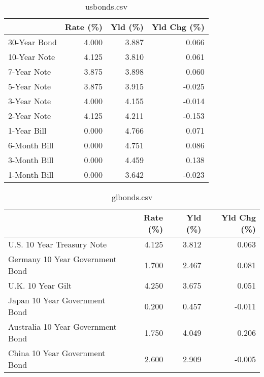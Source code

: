 \documentclass{article}%
\begin{document}
%


\begin{table}[htbp]%
\caption{usbonds.csv}%
\centering%
\begin{adjustbox}{width=1\textwidth}%
\begin{tabular}{lrrr}
\toprule
             &  Rate (\%) &  Yld (\%) &  Yld Chg (\%) \\
\midrule
30-Year Bond &     4.000 &    3.887 &        0.066 \\
10-Year Note &     4.125 &    3.810 &        0.061 \\
 7-Year Note &     3.875 &    3.898 &        0.060 \\
 5-Year Note &     3.875 &    3.915 &       -0.025 \\
 3-Year Note &     4.000 &    4.155 &       -0.014 \\
 2-Year Note &     4.125 &    4.211 &       -0.153 \\
 1-Year Bill &     0.000 &    4.766 &        0.071 \\
6-Month Bill &     0.000 &    4.751 &        0.086 \\
3-Month Bill &     0.000 &    4.459 &        0.138 \\
1-Month Bill &     0.000 &    3.642 &       -0.023 \\
\bottomrule
\end{tabular}
%
\end{adjustbox}%
\end{table}

%


\begin{table}[htbp]%
\caption{glbonds.csv}%
\centering%
\begin{adjustbox}{width=1\textwidth}%
\begin{tabular}{lrrr}
\toprule
                                  &  Rate (\%) &  Yld (\%) &  Yld Chg (\%) \\
\midrule
       U.S. 10 Year Treasury Note &     4.125 &    3.812 &        0.063 \\
  Germany 10 Year Government Bond &     1.700 &    2.467 &        0.081 \\
                U.K. 10 Year Gilt &     4.250 &    3.675 &        0.051 \\
    Japan 10 Year Government Bond &     0.200 &    0.457 &       -0.011 \\
Australia 10 Year Government Bond &     1.750 &    4.049 &        0.206 \\
    China 10 Year Government Bond &     2.600 &    2.909 &       -0.005 \\
\bottomrule
\end{tabular}
%
\end{adjustbox}%
\end{table}
\end{document}
